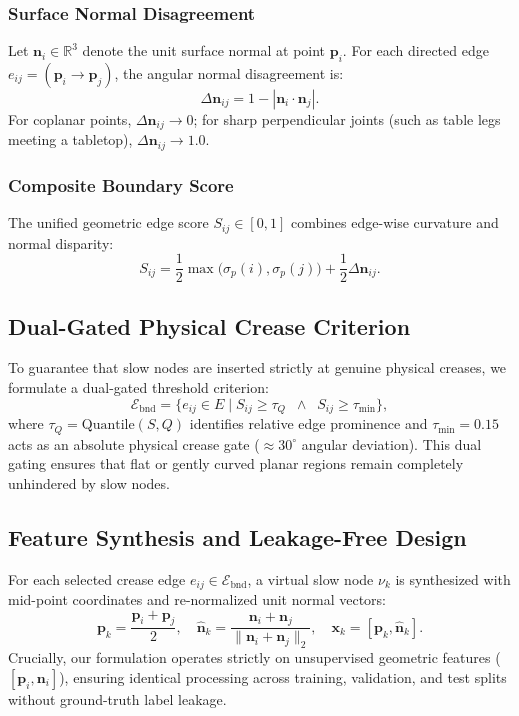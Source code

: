 \documentclass[journal]{IEEEtran}
\begin{document}
\subsubsection{Surface Normal Disagreement}
Let $\mathbf{n}_i \in \mathbb{R}^3$ denote the unit surface normal at point $\mathbf{p}_i$. For each directed edge $e_{ij} = (\mathbf{p}_i \to \mathbf{p}_j)$, the angular normal disagreement is:
\begin{equation}
\Delta \mathbf{n}_{ij} = 1 - |\mathbf{n}_i \cdot \mathbf{n}_j|.
\label{eq:normal_disagree}
\end{equation}
For coplanar points, $\Delta \mathbf{n}_{ij} \to 0$; for sharp perpendicular joints (such as table legs meeting a tabletop), $\Delta \mathbf{n}_{ij} \to 1.0$.

\subsubsection{Composite Boundary Score}
The unified geometric edge score $S_{ij} \in [0, 1]$ combines edge-wise curvature and normal disparity:
\begin{equation}
S_{ij} = \frac{1}{2} \max\big(\sigma_p(i), \sigma_p(j)\big) + \frac{1}{2} \Delta \mathbf{n}_{ij}.
\label{eq:bnd_score}
\end{equation}

\subsection{Dual-Gated Physical Crease Criterion}
To guarantee that slow nodes are inserted strictly at genuine physical creases, we formulate a dual-gated threshold criterion:
\begin{equation}
\mathcal{E}_{\text{bnd}} = \big\{ e_{ij} \in E \;\big|\; S_{ij} \ge \tau_Q \;\;\land\;\; S_{ij} \ge \tau_{\min} \big\},
\label{eq:dual_gate}
\end{equation}
where $\tau_Q = \text{Quantile}(S, Q)$ identifies relative edge prominence and $\tau_{\min} = 0.15$ acts as an absolute physical crease gate ($\approx 30^\circ$ angular deviation). This dual gating ensures that flat or gently curved planar regions remain completely unhindered by slow nodes.

\subsection{Feature Synthesis and Leakage-Free Design}
For each selected crease edge $e_{ij} \in \mathcal{E}_{\text{bnd}}$, a virtual slow node $\nu_k$ is synthesized with mid-point coordinates and re-normalized unit normal vectors:
\begin{equation}
\mathbf{p}_k = \frac{\mathbf{p}_i + \mathbf{p}_j}{2}, \quad \hat{\mathbf{n}}_k = \frac{\mathbf{n}_i + \mathbf{n}_j}{\|\mathbf{n}_i + \mathbf{n}_j\|_2}, \quad \mathbf{x}_k = [\mathbf{p}_k, \hat{\mathbf{n}}_k].
\end{equation}
Crucially, our formulation operates strictly on unsupervised geometric features ($[\mathbf{p}_i, \mathbf{n}_i]$), ensuring identical processing across training, validation, and test splits without ground-truth label leakage.
\end{document}
